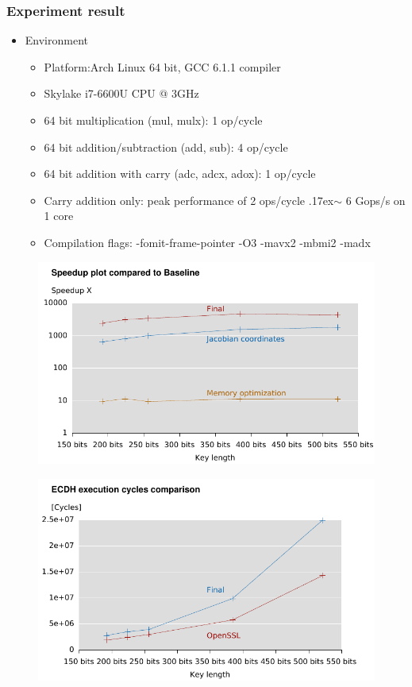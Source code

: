 \begin{frame}
  \frametitle{Experiment result}
  \begin{itemize}
  \item{Environment
  \begin{itemize}
  \setlength\itemsep{0.5em}
  \item{Platform:Arch Linux 64 bit, GCC 6.1.1 compiler}
  \item{Skylake i7-6600U CPU @ 3GHz}
  \item{64 bit multiplication (mul, mulx): 1 op/cycle}
  \item{64 bit addition/subtraction (add, sub): 4 op/cycle}
  \item{64 bit addition with carry (adc, adcx, adox): 1 op/cycle}
  \item{Carry addition only: peak performance of 2 ops/cycle
  {\raise.17ex\hbox{$\scriptstyle\sim$}} 6 Gops/s on 1 core}
  \item{Compilation flags: -fomit-frame-pointer -O3 -mavx2 -mbmi2 -madx}
  \end{itemize}
}
  \setlength\itemsep{1.5em}
  \end{itemize}
\end{frame}
\begin{frame}
\begin{figure}\flushleft		
\includegraphics[scale=0.9, trim={0 0 0 0}]{speedup}		
\end{figure}
\end{frame}
\begin{frame}
\begin{figure}\flushleft		
\includegraphics[scale=0.9, trim={0 0 0 0}]{ecdh}		
\end{figure}
\end{frame}
